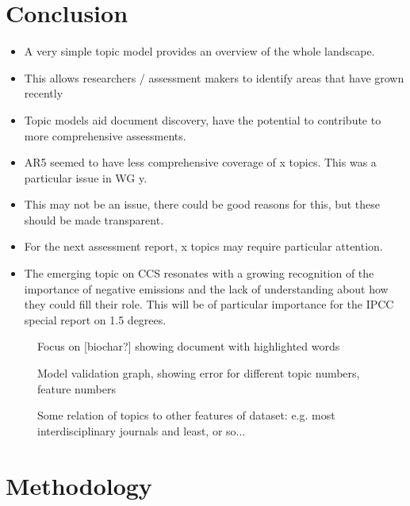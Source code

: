 \documentclass{article}
\begin{document}
{\section*{Conclusion}
\begin{itemize}
	\item A very simple topic model provides an overview of the whole landscape.
    \item This allows researchers / assessment makers to identify areas that have grown recently
    \item Topic models aid document discovery, have the potential to contribute to more comprehensive assessments.
	\item AR5 seemed to have less comprehensive coverage of x topics. This was a particular issue in WG y.
	\item This may not be an issue, there could be good reasons for this, but these should be made transparent.
	\item For the next assessment report, x topics may require particular attention.
	\item The emerging topic on CCS resonates with a growing recognition of the importance of negative emissions and the lack of understanding about how they could fill their role. This will be of particular importance for the IPCC special report on 1.5 degrees.
\end{itemize}




\begin{figure}
    \caption{Focus on [biochar?] showing document with highlighted words}
\end{figure}

\begin{figure}
    \caption{Model validation graph, showing error for different topic numbers, feature numbers}
\end{figure}


\begin{figure}
    \caption{Some relation of topics to other features of dataset: e.g. most interdisciplinary journals and least, or so...}
\end{figure}


\section*{Methodology}

}
\end{document}
